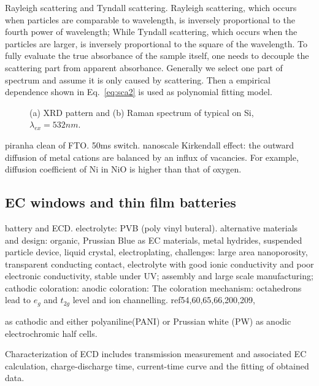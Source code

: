 \documentclass[12pt,oneside]{book}
\begin{document}
Rayleigh scattering and Tyndall scattering. Rayleigh scattering, which occurs when particles are comparable to wavelength, is inversely proportional to the fourth power of wavelength; While Tyndall scattering, which occurs when the particles are larger, is inversely proportional to the square of the wavelength. To fully evaluate the true absorbance of the sample itself, one needs to decouple the scattering part from apparent absorbance. Generally we select one part of spectrum and assume it is only caused by scattering. Then a empirical dependence shown in Eq.~\ref{eq:sca2} is used as polynomial fitting model.
\begin{figure}[htb]
\centering
{}%
\caption[Crystalline phase characterization of  on Si]{(a) XRD pattern and (b) Raman spectrum of typical  on Si, $\lambda_{ex} = 532nm$.}
\label{fig:mooxch}
\end{figure}


piranha clean of FTO. 50ms switch.\cite{Scherer2012} nanoscale Kirkendall effect: the outward diffusion of metal cations are balanced by an influx of vacancies. For example, diffusion coefficient of Ni in NiO is higher than that of oxygen.
\subsection{EC windows and thin film batteries}

battery and ECD.\cite{Granqvist2012} electrolyte: PVB (poly vinyl buteral).
alternative materials and design: organic, Prussian Blue as EC materials, metal hydrides, suspended particle device, liquid crystal, electroplating,
challenges: large area nanoporosity, transparent conducting contact, electrolyte with good ionic conductivity and poor electronic conductivity, stable under UV; assembly and large scale manufacturing;
cathodic coloration:
anodic coloration:
The coloration mechanism:  octahedrons lead to $e_g$ and $t_{2g}$ level and ion channelling.
ref54,60,65,66,200,209,


 as cathodic and either polyaniline(PANI) or Prussian white (PW) as anodic electrochromic half cells. \cite{Heckner2002}

Characterization of ECD includes transmission measurement and associated EC calculation, charge-discharge time, current-time curve and the fitting of obtained data.
\end{document}
